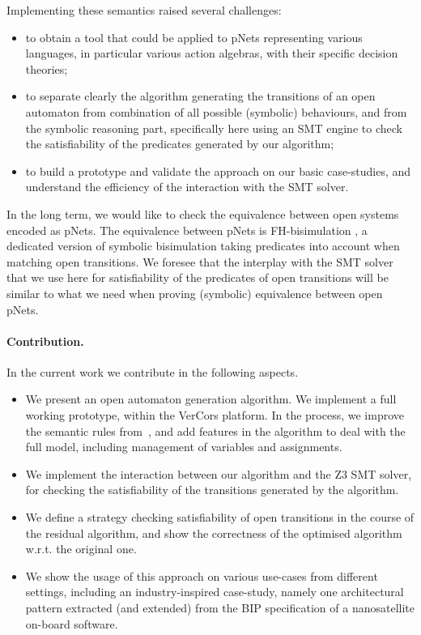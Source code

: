 \documentclass[smallcondensed]{svjour3}
\begin{document}
Implementing these semantics raised several challenges:
\begin{itemize}
	\item to obtain a tool that could be applied to pNets representing
	various languages, in particular various action algebras,
	with their specific decision theories;
	\item to separate clearly the 
	algorithm generating the transitions of an open automaton from
	combination of all possible (symbolic) behaviours, and from
	the symbolic reasoning part, specifically here using an SMT
	engine to check the
	satisfiability of the predicates generated by our algorithm;
	\item to build a prototype and validate the approach on our basic
	case-studies, and understand the efficiency of the interaction
	with the SMT solver.
\end{itemize}

In the long term, we would like to check the equivalence between
open systems encoded as pNets. The equivalence between pNets is
FH-bisimulation \cite{henrio:Forte2016}, a dedicated version of
symbolic bisimulation taking 
predicates into account when matching 
open transitions. We foresee that the interplay with the SMT solver
that we use here for satisfiability of the predicates of open transitions will be
similar to what we need when proving (symbolic) equivalence between open
pNets. 

\paragraph{Contribution.}
In the current work we contribute in the following aspects.
\begin{itemize}
	\item We present an open automaton generation algorithm. We
	implement a full working prototype, within the 
	VerCors platform. In the process, we improve the
	semantic rules from~\cite{henrio:Forte2016}, and add features in
	the algorithm to deal with the full 
	model, including management of variables and assignments.
	\item We implement the interaction between our algorithm and the Z3
	SMT solver, for checking the satisfiability of the transitions
	generated by the algorithm.
	\item We define a strategy checking satisfiability of open transitions in the course of the residual algorithm, and show the correctness of the optimised algorithm w.r.t. the original one.
	\item We show the usage of this approach on various use-cases from different settings, including an
	industry-inspired case-study, namely one architectural pattern
	extracted (and extended) from the BIP specification of a nanosatellite on-board
	software.
\end{itemize}
\end{document}
